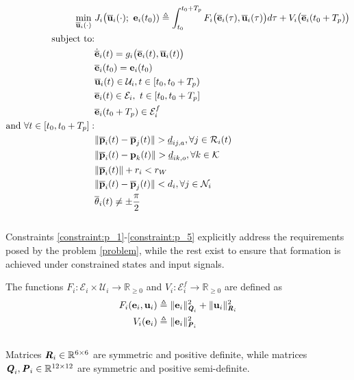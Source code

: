 \begin{align}
  \min\limits_{\overline{\bm{\mathbf{u}}}_i (\cdot)}\ &
    J_i \big(\overline{\bm{\mathbf{u}}}_i (\cdot);\ \bm{\mathbf{e}}_i(t_0)) \triangleq
      \int_{t_0}^{t_0 + T_p} F_i \big(\overline{\bm{\mathbf{e}}}_i(\tau), \overline{\bm{\mathbf{u}}}_i (\tau)\big) d \tau +
      V_i \big(\overline{\bm{\mathbf{e}}}_i (t_0 + T_p)\big) \label{position_based_cost} \\
  \text{subject to:} & \nonumber \\
  & \dot{\overline{\bm{\mathbf{e}}}}_i(t) = g_i \big(\overline{\bm{\mathbf{e}}}_i (t), \overline{\bm{\mathbf{u}}}_i (t)\big) \\
  & \overline{\bm{\mathbf{e}}}_i (t_0) = \bm{\mathbf{e}}_i (t_0) \\
  & \overline{\bm{\mathbf{u}}}_i(t) \in \mathcal{U}_i, t \in [t_0, t_0 + T_p)\\
  & \overline{\bm{\mathbf{e}}}_i (t) \in \mathcal{E}_i,\ t \in [t_0, t_0 + T_p]\\
  & \overline{\bm{\mathbf{e}}}_i (t_0 + T_p) \in \mathcal{E}_i^f \\
  \text{and } \forall t \in [t_0, t_0 + T_p]:& \nonumber \\
  & \|\overline{\bm{\mathbf{p}}}_i(t) - \overline{\bm{\mathbf{p}}}_j(t)\| > \underline{d}_{ij,a}, \forall j \in \mathcal{R}_i(t) \label{constraint:p_1}\\
  & \|\overline{\bm{\mathbf{p}}}_i(t) - \bm{\mathbf{p}}_k(t)\| > \underline{d}_{ik,o}, \forall k \in \mathcal{K} \\
  & \|\overline{\bm{\mathbf{p}}}_i(t)\| + r_i < r_W \\
  & \|\overline{\bm{\mathbf{p}}}_i(t) - \overline{\bm{\mathbf{p}}}_j(t)\| < d_i, \forall j \in \mathcal{N}_i \\
  & \overline{\theta}_i(t) \ne \pm \frac{\pi}{2} \label{constraint:p_5}
\end{align}\\
Constraints \ref{constraint:p_1}-\ref{constraint:p_5} explicitly address the
requirements posed by the problem \eqref{problem}, while the rest exist to
ensure that formation is achieved under constrained states and input signals.

The functions
$F_i : \mathcal{E}_i \times \mathcal{U}_i \to \mathbb{R}_{\geq 0}$ and
$V_i: \mathcal{E}_i^f \to \mathbb{R}_{\geq 0}$ are defined as
\begin{align}
  F_i (\bm{\mathbf{e}}_i, \bm{\mathbf{u}}_i)
    &\triangleq \| \bm{\mathbf{e}}_i\|_{\bm{\mathit{Q}}_i}^2 + \| \bm{\mathbf{u}}_i\|_{\bm{\mathit{R}}_i}^2 \\
  V_i (\bm{\mathbf{e}}_i)
    & \triangleq \| \bm{\mathbf{e}}_i \|_{\bm{\mathit{P}}_i}^2
\end{align}\\
Matrices $\bm{\mathit{R}}_i \in \mathbb{R}^{6 \times 6}$ are symmetric and positive
definite, while matrices $\bm{\mathit{Q}}_i, \bm{\mathit{P}}_i \in \mathbb{R}^{12 \times 12}$
are symmetric and positive semi-definite.

